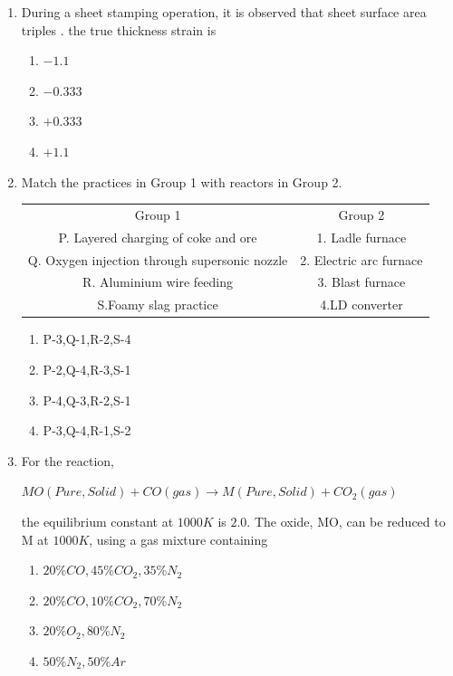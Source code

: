 \documentclass[journal]{IEEEtran}
\theoremstyle{remark}
\begin{document}
\begin{enumerate}
\item During a sheet stamping operation, it is observed that sheet surface area triples . the true thickness strain is  \hfill{}
\begin{multicols}{4}
\begin{enumerate}
\item $-1.1$
\item $-0.333$
\item $+0.333$
\item $+1.1$
\end{enumerate}
\end{multicols}
\item Match the practices in Group 1 with reactors in Group 2.\hfill{}
\begin{center}
\begin{tabular}{c c}
Group 1     &  Group 2\\
P. Layered charging of coke and ore     &1. Ladle furnace\\
Q. Oxygen injection through supersonic nozzle &2. Electric arc furnace\\ 
R. Aluminium wire feeding &3. Blast furnace\\
S.Foamy slag practice & 4.LD converter
\end{tabular}
\end{center}
\begin{multicols}{2}
\begin{enumerate}
\item P-3,Q-1,R-2,S-4
\item P-2,Q-4,R-3,S-1
\item P-4,Q-3,R-2,S-1
\item P-3,Q-4,R-1,S-2
\end{enumerate}
\end{multicols}

\item For the reaction,\\
\begin{center}
    
$MO(Pure, Solid) + CO(gas) \longrightarrow M(Pure, Solid) + CO_2 (gas)$
\end{center}
the equilibrium constant at $1000K$ is $2.0$. The oxide, MO, can be reduced to M at $1000K$, using a gas
mixture containing
\hfill{}
\begin{multicols}{2}
\begin{enumerate}
\item $20\% CO , 45\% CO_2, 35\% N_2$
\item  $20\% CO, 10\% CO_2, 70\% N_2$
\item$20\% O_2, 80\% N_2$
\item $50\% N_2, 50\%Ar$
\end{enumerate}
\end{multicols}


\end{enumerate}
\end{document}
